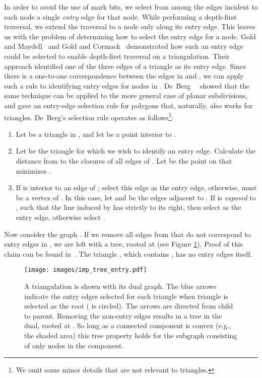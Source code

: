   In order to avoid the use of mark bits, we select from among the edges incident 
  to each node a single \emph{entry} edge for that node. 
  While performing a depth-first traversal, we extend the traversal 
  to a node only along its entry edge.
  This leaves us with the problem of determining how to select the entry edge
  for a node.  
  Gold and Maydell~\cite{gold_maydell_1978} and Gold and 
  Cormack~\cite{gold_cormack86} demonstrated how such an entry edge could 
  be selected to enable depth-first traversal on a triangulation.
  Their approach identified one of the three edges of a triangle as its 
  entry edge.
  Since there is a one-to-one correspondence between the edges in  
  and , we can apply such a rule to identifying entry
  edges for nodes in . 
  De~Berg~\etal~\cite{DBLP:journals/gis/BergKOO97} showed that the same technique can 
  be applied to the more general case of planar subdivisions, and 
  gave an entry-edge selection rule for polygons that, naturally, also works 
  for triangles.
  De~Berg's selection rule operates as follows\footnote{We 
  omit some minor details that are not relevant to triangles.}:

  \begin{enumerate}
  \item Let  be a triangle in , and let  be a point interior
  to .
  \item Let  be the triangle for which we wish to identify an entry edge.
  Calculate the distance from  to the closures of all edges of .
  Let  be the point on  that minimizes . 
  \item If  is interior to an edge of ; select this edge as the
  entry edge, otherwise,  must be a vertex of . In this case, let
   and  be the edges adjacent to . If  is \emph{exposed}
  to , such that the line  induced by  has
   strictly to its right, then select  as the entry edge, otherwise
  select . 
  \end{enumerate}

  Now consider the graph .
  If we remove all edges from  that
  do not correspond to entry edges in , we are left with a tree, 
  rooted at  (see Figure \ref{fig:imp_tree_entry}).
  Proof of this claim can be found in~\cite{DBLP:journals/gis/BergKOO97}.
  The triangle , which contains , has no entry edges itself.

  \begin{figure}[th]
	  \centering
		  \texttt{[image: images/imp\_tree\_entry.pdf]}
	  \caption[Dual graph with non-entry edges removed forms a tree]{ 
	    A triangulation is shown with its dual graph. 
	    The blue arrows indicate the entry edges selected for each triangle when
	    triangle  is selected as the root ( is circled). 
	    The arrows are directed from child to parent.
	    Removing the non-entry edges results in a tree in the dual, rooted at 
	    .
	    So long as a connected component is convex (e.g., the shaded area) this 
	    tree property holds for the subgraph consisting of only nodes in the
	    component.} \label{fig:imp_tree_entry}
  \end{figure}
	  

